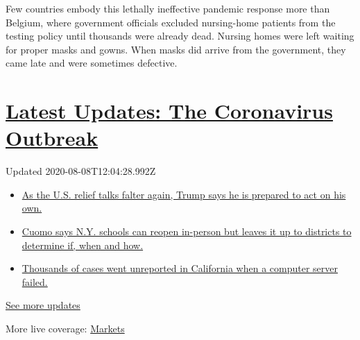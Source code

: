 Few countries embody this lethally ineffective pandemic response more
than Belgium, where government officials excluded nursing-home patients
from the testing policy until thousands were already dead. Nursing homes
were left waiting for proper masks and gowns. When masks did arrive from
the government, they came late and were sometimes defective.

\hypertarget{latest-updates-the-coronavirus-outbreak}{%
\section{\texorpdfstring{\href{https://www.nytimes.com/2020/08/07/world/covid-19-news.html?action=click\&pgtype=Article\&state=default\&region=MAIN_CONTENT_1\&context=storylines_live_updates}{Latest
Updates: The Coronavirus
Outbreak}}{Latest Updates: The Coronavirus Outbreak}}\label{latest-updates-the-coronavirus-outbreak}}

Updated 2020-08-08T12:04:28.992Z

\begin{itemize}
\tightlist
\item
  \href{https://www.nytimes.com/2020/08/07/world/covid-19-news.html?action=click\&pgtype=Article\&state=default\&region=MAIN_CONTENT_1\&context=storylines_live_updates\#link-1f86d03a}{As
  the U.S. relief talks falter again, Trump says he is prepared to act
  on his own.}
\item
  \href{https://www.nytimes.com/2020/08/07/world/covid-19-news.html?action=click\&pgtype=Article\&state=default\&region=MAIN_CONTENT_1\&context=storylines_live_updates\#link-3f64a70a}{Cuomo
  says N.Y. schools can reopen in-person but leaves it up to districts
  to determine if, when and how.}
\item
  \href{https://www.nytimes.com/2020/08/07/world/covid-19-news.html?action=click\&pgtype=Article\&state=default\&region=MAIN_CONTENT_1\&context=storylines_live_updates\#link-14e70066}{Thousands
  of cases went unreported in California when a computer server failed.}
\end{itemize}

\href{https://www.nytimes.com/2020/08/07/world/covid-19-news.html?action=click\&pgtype=Article\&state=default\&region=MAIN_CONTENT_1\&context=storylines_live_updates}{See
more updates}

More live coverage:
\href{https://www.nytimes.com/live/2020/08/07/business/stock-market-today-coronavirus?action=click\&pgtype=Article\&state=default\&region=MAIN_CONTENT_1\&context=storylines_live_updates}{Markets}


